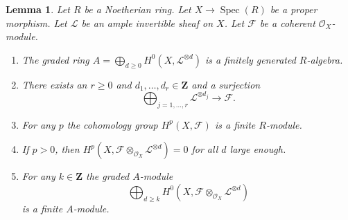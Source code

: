 \documentclass{stacks-project}
\theoremstyle{plain}
\newtheorem{lemma}[subsection]{Lemma}
\theoremstyle{definition}
\theoremstyle{remark}
\numberwithin{equation}{subsection}
\def\Spec{\mathop{\mathrm{Spec}}}
\begin{document}
\begin{lemma}
\label{lemma-coherent-proper-ample}
Let $R$ be a Noetherian ring. Let $X \to \Spec(R)$ be a proper morphism.
Let $\mathcal{L}$ be an ample invertible sheaf on $X$. Let $\mathcal{F}$
be a coherent $\mathcal{O}_X$-module.
\begin{enumerate}
\item The graded ring
$A = \bigoplus_{d \geq 0} H^0(X, \mathcal{L}^{\otimes d})$
is a finitely generated $R$-algebra.
\item There exists an $r \geq 0$ and
$d_1, \ldots, d_r \in \mathbf{Z}$ and a surjection
$$
\bigoplus\nolimits_{j = 1, \ldots, r} \mathcal{L}^{\otimes d_j}
\longrightarrow \mathcal{F}.
$$
\item For any $p$ the cohomology group $H^p(X, \mathcal{F})$ is a finite
$R$-module.
\item If $p > 0$, then
$H^p(X, \mathcal{F} \otimes_{\mathcal{O}_X} \mathcal{L}^{\otimes d}) = 0$
for all $d$ large enough.
\item For any $k \in \mathbf{Z}$ the graded $A$-module
$$
\bigoplus\nolimits_{d \geq k}
H^0(X, \mathcal{F} \otimes_{\mathcal{O}_X} \mathcal{L}^{\otimes d})
$$
is a finite $A$-module.
\end{enumerate}
\end{lemma}
\end{document}
